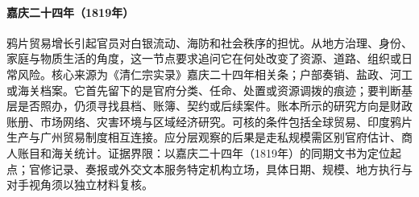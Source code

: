 \hypertarget{social:EQ-1819-OPIUM-TRADE-GROWTH}{}\paragraph{嘉庆二十四年（1819年）}鸦片贸易增长引起官员对白银流动、海防和社会秩序的担忧。从地方治理、身份、家庭与物质生活的角度，这一节点要求追问它在何处改变了资源、道路、组织或日常风险。核心来源为《清仁宗实录》嘉庆二十四年相关条；户部奏销、盐政、河工或海关档案。它首先留下的是官府分类、任命、处置或资源调拨的痕迹；要判断基层是否照办，仍须寻找县档、账簿、契约或后续案件。账本所示的研究方向是财政账册、市场网络、灾害环境与区域经济研究。可核的条件包括全球贸易、印度鸦片生产与广州贸易制度相互连接。应分层观察的后果是走私规模需区别官府估计、商人账目和海关统计。证据界限：以嘉庆二十四年（1819年）的同期文书为定位起点；官修记录、奏报或外交文本服务特定机构立场，具体日期、规模、地方执行与对手视角须以独立材料复核。
